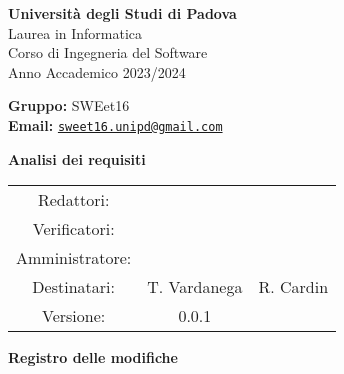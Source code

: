 \documentclass[a4paper, 11pt]{article}
\begin{document}
\begin{minipage}{0.35\linewidth}
   
\end{minipage}\hfil
\begin{minipage}{0.55\linewidth}
\textbf{Università degli Studi di Padova} \\
Laurea in Informatica \\
Corso di Ingegneria del Software \\
Anno Accademico 2023/2024
\end{minipage}

\vspace{5mm}

\begin{minipage}{0.35\linewidth}

\end{minipage}\hfil
\begin{minipage}{0.55\linewidth}
\textbf{Gruppo:} SWEet16 \\
\textbf{Email:} 
\href{mailto:sweet16.unipd@gmail.com}{\nolinkurl{sweet16.unipd@gmail.com}}
\end{minipage}

\vspace{15mm}

\begin{center}
\begin{Huge}
        \textbf{Analisi dei requisiti} \\
        \vspace{4mm}
        \end{Huge}

\vspace{20mm}

\begin{large}
\begin{spacing}{1.4}
\begin{tabular}{c c c}
   Redattori:  &   & \\
   Verificatori: &  &  \\
   Amministratore: &  & \\
   Destinatari: & T. Vardanega & R. Cardin \\  
   Versione: & 0.0.1 & 
\end{tabular}
\end{spacing}
\end{large}
\end{center}

\pagebreak

\begin{huge}
    \textbf{Registro delle modifiche}
\end{huge}
\vspace{5pt}
\end{document}
